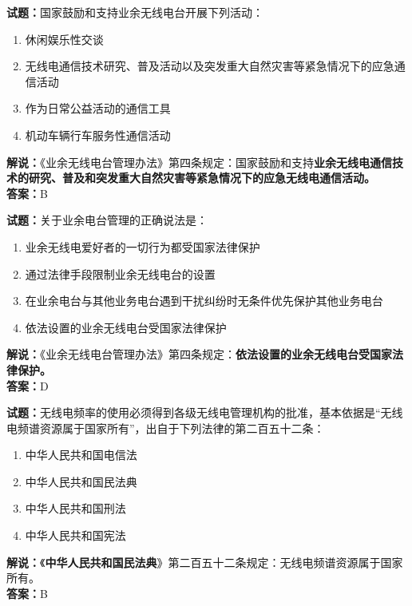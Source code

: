 \documentclass{ctexbook}
\begin{document}
\bigskip




\noindent\textbf{试题：}国家鼓励和支持业余无线电台开展下列活动：
\begin{enumerate}[leftmargin=3em]
\item 休闲娱乐性交谈
\item 无线电通信技术研究、普及活动以及突发重大自然灾害等紧急情况下的应急通信活动
\item 作为日常公益活动的通信工具
\item 机动车辆行车服务性通信活动
\end{enumerate}
\noindent\textbf{解说：}《业余无线电台管理办法》第四条规定：国家鼓励和支持\textbf{业余无线电通信技术的研究、普及和突发重大自然灾害等紧急情况下的应急无线电通信活动。}\\\noindent\textbf{答案：}B

\bigskip




\noindent\textbf{试题：}关于业余电台管理的正确说法是：
\begin{enumerate}[leftmargin=3em]
\item 业余无线电爱好者的一切行为都受国家法律保护
\item 通过法律手段限制业余无线电台的设置
\item 在业余电台与其他业务电台遇到干扰纠纷时无条件优先保护其他业务电台
\item 依法设置的业余无线电台受国家法律保护
\end{enumerate}
\noindent\textbf{解说：}《业余无线电台管理办法》第四条规定：\textbf{依法设置的业余无线电台受国家法律保护。}\\\noindent\textbf{答案：}D

\bigskip



\noindent\textbf{试题：}无线电频率的使用必须得到各级无线电管理机构的批准，基本依据是“无线电频谱资源属于国家所有”，出自于下列法律的第二百五十二条： 
\begin{enumerate}[leftmargin=3em]
\item 中华人民共和国电信法
\item 中华人民共和国民法典
\item 中华人民共和国刑法
\item 中华人民共和国宪法
\end{enumerate}
\noindent\textbf{解说：}《\textbf{中华人民共和国民法典}》第二百五十二条规定：无线电频谱资源属于国家所有。\\\noindent\textbf{答案：}B
\end{document}
